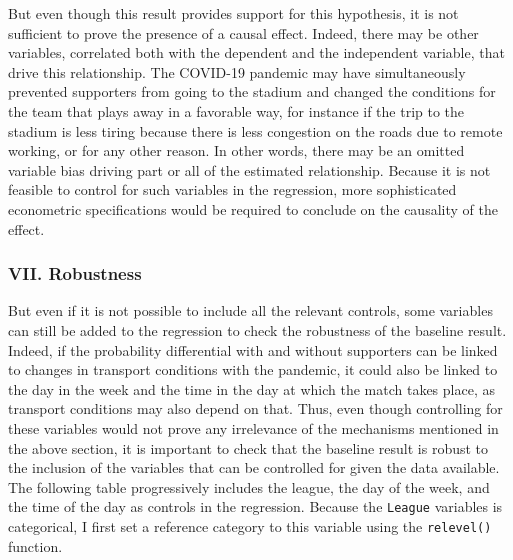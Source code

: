 \documentclass[
]{article}
\begin{document}
But even though this result provides support for this hypothesis, it is
not sufficient to prove the presence of a causal effect. Indeed, there
may be other variables, correlated both with the dependent and the
independent variable, that drive this relationship. The COVID-19
pandemic may have simultaneously prevented supporters from going to the
stadium and changed the conditions for the team that plays away in a
favorable way, for instance if the trip to the stadium is less tiring
because there is less congestion on the roads due to remote working, or
for any other reason. In other words, there may be an omitted variable
bias driving part or all of the estimated relationship. Because it is
not feasible to control for such variables in the regression, more
sophisticated econometric specifications would be required to conclude
on the causality of the effect.

\hypertarget{vii.-robustness}{%
\subsubsection{VII. Robustness}\label{vii.-robustness}}

But even if it is not possible to include all the relevant controls,
some variables can still be added to the regression to check the
robustness of the baseline result. Indeed, if the probability
differential with and without supporters can be linked to changes in
transport conditions with the pandemic, it could also be linked to the
day in the week and the time in the day at which the match takes place,
as transport conditions may also depend on that. Thus, even though
controlling for these variables would not prove any irrelevance of the
mechanisms mentioned in the above section, it is important to check that
the baseline result is robust to the inclusion of the variables that can
be controlled for given the data available. The following table
progressively includes the league, the day of the week, and the time of
the day as controls in the regression. Because the \texttt{League}
variables is categorical, I first set a reference category to this
variable using the \texttt{relevel()} function.
\end{document}
